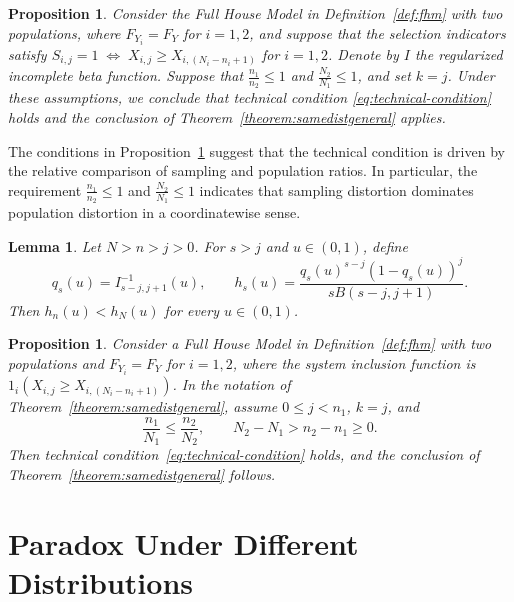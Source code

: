 \documentclass[12pt]{article}
\newtheorem{lemma}[theorem]{Lemma}
\newtheorem{prop}[theorem]{Proposition}
\begin{document}
\begin{prop} \label{prop:condition}
Consider the Full House Model in Definition~\ref{def:fhm} with two populations, where $F_{Y_i} = F_{Y}$ for $i=1,2$, and suppose that the selection indicators satisfy $S_{i,j} = 1 \;\Longleftrightarrow\; X_{i,j} \ge X_{i,(N_i - n_i + 1)}$ for $i=1,2$. Denote by $I$ the regularized incomplete beta function. Suppose that $\frac{n_1}{n_2}\leq 1$ and $\frac{N_2}{N_1} \leq 1$, and set $k = j$. Under these assumptions, we conclude that technical condition \eqref{eq:technical-condition} holds and the conclusion of Theorem~\ref{theorem:samedistgeneral} applies.	
\end{prop}

The conditions in Proposition~\ref{prop:condition} suggest that the technical condition is driven by the relative comparison of sampling and population ratios. In particular, the requirement $\frac{n_1}{n_2} \le 1$ and $\frac{N_2}{N_1} \le 1$ indicates that sampling distortion dominates population distortion in a coordinatewise sense. %

\begin{lemma}\label{lemma:beta-quantile-density-comparison}
Let $N>n>j>0$. For $s>j$ and $u\in(0,1)$, define
\[
 q_s(u)=I_{s-j,j+1}^{-1}(u),
 \qquad
 h_s(u)=\frac{q_s(u)^{s-j}(1-q_s(u))^j}{sB(s-j,j+1)}.
\]
Then $h_n(u)<h_N(u)$ for every $u\in(0,1)$.
\end{lemma}

\begin{prop}\label{prop:condition2}
Consider a Full House Model in Definition~\ref{def:fhm} with two
populations and $F_{Y_i}=F_Y$ for $i=1,2$, where the system inclusion
function is $1_i(X_{i,j}\geq X_{i,(N_i-n_i+1)})$.
In the notation of Theorem~\ref{theorem:samedistgeneral}, assume
$0\leq j<n_1$, $k=j$, and
\[
 \frac{n_1}{N_1}\leq\frac{n_2}{N_2},
 \qquad N_2-N_1>n_2-n_1\geq0.
\]
Then technical condition~\eqref{eq:technical-condition} holds, and
the conclusion of Theorem~\ref{theorem:samedistgeneral} follows.
\end{prop}


\section{Paradox Under Different Distributions}
\label{sec:diffdist}
\end{document}
